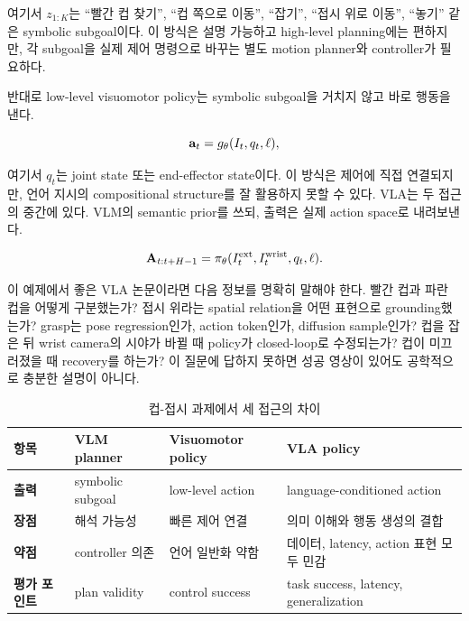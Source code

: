 여기서 $z_{1:K}$는 ``빨간 컵 찾기'', ``컵 쪽으로 이동'', ``잡기'', ``접시 위로 이동'', ``놓기'' 같은 symbolic subgoal이다. 이 방식은 설명 가능하고 high-level planning에는 편하지만, 각 subgoal을 실제 제어 명령으로 바꾸는 별도 motion planner와 controller가 필요하다.

반대로 low-level visuomotor policy는 symbolic subgoal을 거치지 않고 바로 행동을 낸다.

\begin{equation}
  \mathbf{a}_t
  =
  g_\theta(I_t, q_t, \ell),
\end{equation}

여기서 $q_t$는 joint state 또는 end-effector state이다. 이 방식은 제어에 직접 연결되지만, 언어 지시의 compositional structure를 잘 활용하지 못할 수 있다. VLA는 두 접근의 중간에 있다. VLM의 semantic prior를 쓰되, 출력은 실제 action space로 내려보낸다.

\begin{equation}
  \mathbf{A}_{t:t+H-1}
  =
  \pi_\theta(I^{\mathrm{ext}}_t, I^{\mathrm{wrist}}_t, q_t, \ell).
\end{equation}

이 예제에서 좋은 VLA 논문이라면 다음 정보를 명확히 말해야 한다. 빨간 컵과 파란 컵을 어떻게 구분했는가? 접시 위라는 spatial relation을 어떤 표현으로 grounding했는가? grasp는 pose regression인가, action token인가, diffusion sample인가? 컵을 잡은 뒤 wrist camera의 시야가 바뀔 때 policy가 closed-loop로 수정되는가? 컵이 미끄러졌을 때 recovery를 하는가? 이 질문에 답하지 못하면 성공 영상이 있어도 공학적으로 충분한 설명이 아니다.

\begin{table}[t]
  \centering
  \caption{컵-접시 과제에서 세 접근의 차이}
  \label{tab:cup_plate_example}
  \begin{tabularx}{\textwidth}{>{\bfseries}p{30mm}XXX}
    \toprule
    항목 & VLM planner & Visuomotor policy & VLA policy \\
    \midrule
    출력 & symbolic subgoal & low-level action & language-conditioned action \\
    장점 & 해석 가능성 & 빠른 제어 연결 & 의미 이해와 행동 생성의 결합 \\
    약점 & controller 의존 & 언어 일반화 약함 & 데이터, latency, action 표현 모두 민감 \\
    평가 포인트 & plan validity & control success & task success, latency, generalization \\
    \bottomrule
  \end{tabularx}
\end{table}

